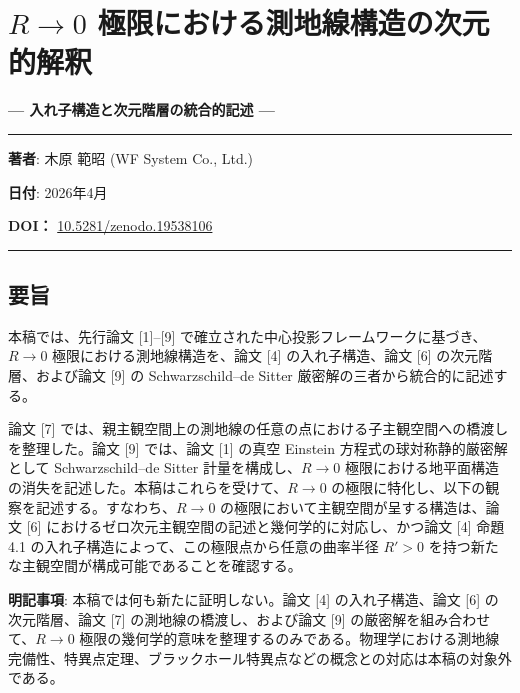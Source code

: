 \documentclass[a4paper,11pt]{ltjsarticle}
\theoremstyle{definition}
\begin{document}
\section{\texorpdfstring{\(R \to 0\)
極限における測地線構造の次元的解釈}{R \textbackslash to 0 極限における測地線構造の次元的解釈}}\label{r-to-0-ux6975ux9650ux306bux304aux3051ux308bux6e2cux5730ux7ddaux69cbux9020ux306eux6b21ux5143ux7684ux89e3ux91c8}

\textbf{--- 入れ子構造と次元階層の統合的記述 ---}

\begin{center}\rule{0.5\linewidth}{0.5pt}\end{center}

\textbf{著者}: 木原 範昭 (WF System Co., Ltd.)

\textbf{日付}: 2026年4月

\textbf{DOI：}
\href{https://doi.org/10.5281/zenodo.19538106}{10.5281/zenodo.19538106}

\begin{center}\rule{0.5\linewidth}{0.5pt}\end{center}

\subsection{要旨}\label{ux8981ux65e8}

本稿では、先行論文 {[}1{]}--{[}9{]}
で確立された中心投影フレームワークに基づき、\(R \to 0\)
極限における測地線構造を、論文 {[}4{]} の入れ子構造、論文 {[}6{]}
の次元階層、および論文 {[}9{]} の Schwarzschild--de Sitter
厳密解の三者から統合的に記述する。

論文 {[}7{]}
では、親主観空間上の測地線の任意の点における子主観空間への橋渡しを整理した。論文
{[}9{]} では、論文 {[}1{]} の真空 Einstein
方程式の球対称静的厳密解として Schwarzschild--de Sitter
計量を構成し、\(R \to 0\)
極限における地平面構造の消失を記述した。本稿はこれらを受けて、\(R \to 0\)
の極限に特化し、以下の観察を記述する。すなわち、\(R \to 0\)
の極限において主観空間が呈する構造は、論文 {[}6{]}
におけるゼロ次元主観空間の記述と幾何学的に対応し、かつ論文 {[}4{]} 命題
4.1 の入れ子構造によって、この極限点から任意の曲率半径 \(R' > 0\)
を持つ新たな主観空間が構成可能であることを確認する。

\textbf{明記事項}: 本稿では何も新たに証明しない。論文 {[}4{]}
の入れ子構造、論文 {[}6{]} の次元階層、論文 {[}7{]}
の測地線の橋渡し、および論文 {[}9{]} の厳密解を組み合わせて、\(R \to 0\)
極限の幾何学的意味を整理するのみである。物理学における測地線完備性、特異点定理、ブラックホール特異点などの概念との対応は本稿の対象外である。
\end{document}
